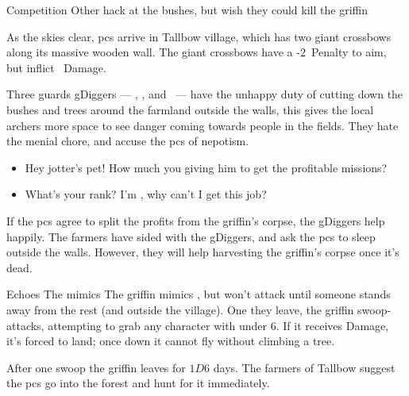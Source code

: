 \documentclass[10pt,twoside]{book}
\begin{document}
\begin{figure}[t]
\end{figure}%

{Competition}%
{Other  hack at the bushes, but wish they could kill the \gls{griffin}}%

As the skies clear, \glspl{pc} arrive in Tallbow \gls{village}, which has two giant \glspl{crossbow} along its massive wooden wall.
The giant \glspl{crossbow} have a -2~Penalty to aim, but inflict ~Damage.

Three \glspl{guard} \glspl{gDigger} --- \composeHumanName, \composeHumanName, and \composeHumanName\ --- have the unhappy duty of cutting down the bushes and trees around the farmland outside the walls, this gives the local archers more space to see danger coming towards people in the fields.
They hate the menial chore, and accuse the \glspl{pc} of nepotism.

\begin{itemize}\it
  \item
  Hey \gls{jotter}'s pet!
  How much you giving him to get the profitable missions?
  \item
  What's your rank?
  I'm , why can't I get this job?
\end{itemize}

If the \glspl{pc} agree to split the profits from the \gls{griffin}'s corpse, the \glspl{gDigger} help happily.
The farmers have sided with the \glspl{gDigger}, and ask the \glspl{pc} to sleep outside the walls.
However, they will help \gls{harvesting} the \gls{griffin}'s corpse once it's dead.

\begin{figure}[ht]
\end{figure}%

{Echoes}%
{The  mimics }%
The \gls{griffin} mimics , but won't attack until someone stands away from the rest (and outside the \gls{village}).
One they leave, the \gls{griffin} swoop-attacks, attempting to grab any character with  under 6.
If it receives Damage, it's forced to land; once down it cannot fly without climbing a tree.

After one swoop the \gls{griffin} leaves for $1D6$ days.
The farmers of Tallbow suggest the \glspl{pc} go into the forest and hunt for it immediately.
\end{document}
